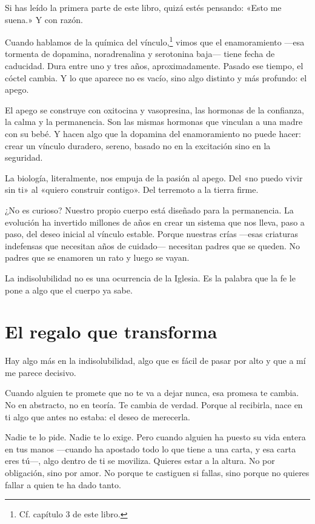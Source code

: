 Si has leído la primera parte de este libro, quizá estés pensando: «Esto me suena.» Y con razón.

Cuando hablamos de la química del vínculo,\footnote{Cf. capítulo 3 de este libro.} vimos que el enamoramiento ---esa tormenta de dopamina, noradrenalina y serotonina baja--- tiene fecha de caducidad. Dura entre uno y tres años, aproximadamente. Pasado ese tiempo, el cóctel cambia. Y lo que aparece no es vacío, sino algo distinto y más profundo: el apego.

El apego se construye con oxitocina y vasopresina, las hormonas de la confianza, la calma y la permanencia. Son las mismas hormonas que vinculan a una madre con su bebé. Y hacen algo que la dopamina del enamoramiento no puede hacer: crear un vínculo duradero, sereno, basado no en la excitación sino en la seguridad.

La biología, literalmente, nos empuja de la pasión al apego. Del «no puedo vivir sin ti» al «quiero construir contigo». Del terremoto a la tierra firme.

¿No es curioso? Nuestro propio cuerpo está diseñado para la permanencia. La evolución ha invertido millones de años en crear un sistema que nos lleva, paso a paso, del deseo inicial al vínculo estable. Porque nuestras crías ---esas criaturas indefensas que necesitan años de cuidado--- necesitan padres que se queden. No padres que se enamoren un rato y luego se vayan.

La indisolubilidad no es una ocurrencia de la Iglesia. Es la palabra que la fe le pone a algo que el cuerpo ya sabe.

\section{El regalo que transforma}

Hay algo más en la indisolubilidad, algo que es fácil de pasar por alto y que a mí me parece decisivo.

Cuando alguien te promete que no te va a dejar nunca, esa promesa te cambia. No en abstracto, no en teoría. Te cambia de verdad. Porque al recibirla, nace en ti algo que antes no estaba: el deseo de merecerla.

Nadie te lo pide. Nadie te lo exige. Pero cuando alguien ha puesto su vida entera en tus manos ---cuando ha apostado todo lo que tiene a una carta, y esa carta eres tú---, algo dentro de ti se moviliza. Quieres estar a la altura. No por obligación, sino por amor. No porque te castiguen si fallas, sino porque no quieres fallar a quien te ha dado tanto.

